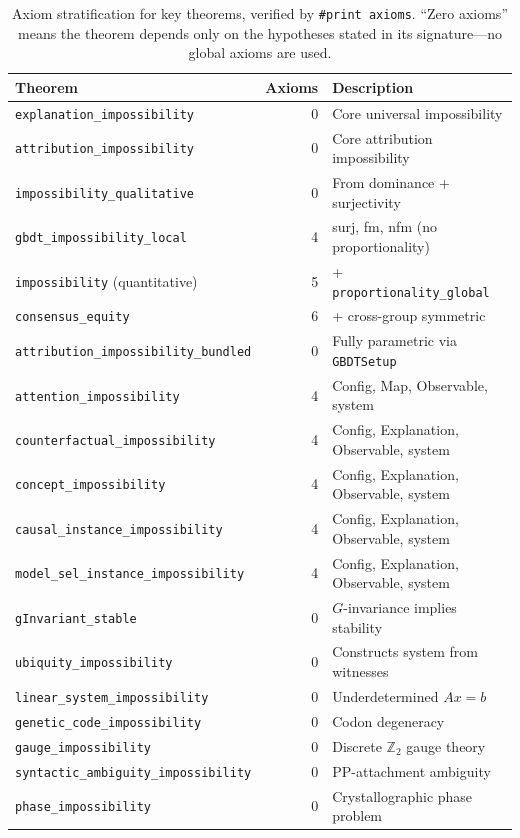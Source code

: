 \documentclass[11pt,a4paper]{article}
\begin{document}
\begin{table}[ht]
\centering
\caption{Axiom stratification for key theorems, verified by \texttt{\#print axioms}.
  ``Zero axioms'' means the theorem depends only on the hypotheses stated in its
  signature---no global axioms are used.}
\label{tab:axiom-strat}
\footnotesize
\begin{tabular}{@{}lrl@{}}
\toprule
Theorem & Axioms & Description \\
\midrule
\texttt{explanation\_impossibility} & 0 & Core universal impossibility \\
\texttt{attribution\_impossibility} & 0 & Core attribution impossibility \\
\texttt{impossibility\_qualitative} & 0 & From dominance + surjectivity \\
\texttt{gbdt\_impossibility\_local} & 4 & surj, fm, nfm (no proportionality) \\
\texttt{impossibility} (quantitative) & 5 & + \texttt{proportionality\_global} \\
\texttt{consensus\_equity} & 6 & + cross-group symmetric \\
\texttt{attribution\_impossibility\_bundled} & 0 & Fully parametric via \texttt{GBDTSetup} \\
\texttt{attention\_impossibility} & 4 & Config, Map, Observable, system \\
\texttt{counterfactual\_impossibility} & 4 & Config, Explanation, Observable, system \\
\texttt{concept\_impossibility} & 4 & Config, Explanation, Observable, system \\
\texttt{causal\_instance\_impossibility} & 4 & Config, Explanation, Observable, system \\
\texttt{model\_sel\_instance\_impossibility} & 4 & Config, Explanation, Observable, system \\
\texttt{gInvariant\_stable} & 0 & $G$-invariance implies stability \\
\texttt{ubiquity\_impossibility} & 0 & Constructs system from witnesses \\
\texttt{linear\_system\_impossibility} & 0 & Underdetermined $Ax=b$ \\
\texttt{genetic\_code\_impossibility} & 0 & Codon degeneracy \\
\texttt{gauge\_impossibility} & 0 & Discrete $\mathbb{Z}_2$ gauge theory \\
\texttt{syntactic\_ambiguity\_impossibility} & 0 & PP-attachment ambiguity \\
\texttt{phase\_impossibility} & 0 & Crystallographic phase problem \\

\end{tabular}
\end{table}
\end{document}
